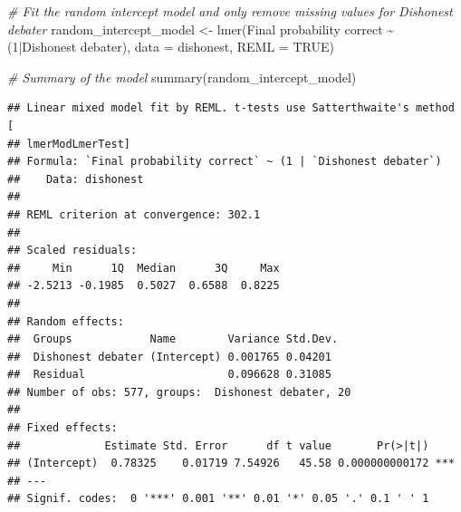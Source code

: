 \documentclass[
]{article}
\newenvironment{Shaded}{\begin{snugshade}}{\end{snugshade}}
\newcommand{\AttributeTok}[1]{\textcolor[rgb]{0.77,0.63,0.00}{#1}}
\newcommand{\CommentTok}[1]{\textcolor[rgb]{0.56,0.35,0.01}{\textit{#1}}}
\newcommand{\ConstantTok}[1]{\textcolor[rgb]{0.00,0.00,0.00}{#1}}
\newcommand{\DecValTok}[1]{\textcolor[rgb]{0.00,0.00,0.81}{#1}}
\newcommand{\FunctionTok}[1]{\textcolor[rgb]{0.00,0.00,0.00}{#1}}
\newcommand{\NormalTok}[1]{#1}
\newcommand{\OtherTok}[1]{\textcolor[rgb]{0.56,0.35,0.01}{#1}}
\newcommand{\SpecialCharTok}[1]{\textcolor[rgb]{0.00,0.00,0.00}{#1}}
\newcommand{\StringTok}[1]{\textcolor[rgb]{0.31,0.60,0.02}{#1}}
\begin{document}
\begin{Shaded}
\begin{Highlighting}[]
\CommentTok{\# Fit the random intercept model and only remove missing values for \textquotesingle{}Dishonest debater\textquotesingle{}}
\NormalTok{random\_intercept\_model }\OtherTok{\textless{}{-}} \FunctionTok{lmer}\NormalTok{(}\StringTok{\textasciigrave{}}\AttributeTok{Final probability correct}\StringTok{\textasciigrave{}} \SpecialCharTok{\textasciitilde{}}\NormalTok{ (}\DecValTok{1}\SpecialCharTok{|}\StringTok{\textasciigrave{}}\AttributeTok{Dishonest debater}\StringTok{\textasciigrave{}}\NormalTok{), }
                                \AttributeTok{data =}\NormalTok{ dishonest, }
                                \AttributeTok{REML =} \ConstantTok{TRUE}\NormalTok{)}

\CommentTok{\# Summary of the model}
\FunctionTok{summary}\NormalTok{(random\_intercept\_model)}
\end{Highlighting}
\end{Shaded}

\begin{verbatim}
## Linear mixed model fit by REML. t-tests use Satterthwaite's method [
## lmerModLmerTest]
## Formula: `Final probability correct` ~ (1 | `Dishonest debater`)
##    Data: dishonest
## 
## REML criterion at convergence: 302.1
## 
## Scaled residuals: 
##     Min      1Q  Median      3Q     Max 
## -2.5213 -0.1985  0.5027  0.6588  0.8225 
## 
## Random effects:
##  Groups            Name        Variance Std.Dev.
##  Dishonest debater (Intercept) 0.001765 0.04201 
##  Residual                      0.096628 0.31085 
## Number of obs: 577, groups:  Dishonest debater, 20
## 
## Fixed effects:
##             Estimate Std. Error      df t value       Pr(>|t|)    
## (Intercept)  0.78325    0.01719 7.54926   45.58 0.000000000172 ***
## ---
## Signif. codes:  0 '***' 0.001 '**' 0.01 '*' 0.05 '.' 0.1 ' ' 1
\end{verbatim}

\begin{Shaded}
\end{Shaded}
\end{document}
